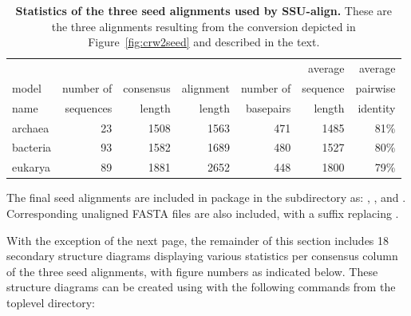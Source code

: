 \begin{table}
\begin{center}
\begin{tabular}{lrrrrrr} \hline
        &           &           &           &           & average   & average  \\
model   & number of & consensus & alignment & number of & sequence  & pairwise \\
name    & sequences & length    & length    & basepairs & length    & identity \\ \hline
archaea & 23        & 1508      & 1563      & 471       & 1485      & 81\%     \\
bacteria& 93        & 1582      & 1689      & 480       & 1527      & 80\%     \\
eukarya  & 89       & 1881      & 2652      & 448       & 1800      & 79\%     \\ 
\end{tabular}
\caption[Statistics of the three seed alignments used by SSU-align.]
{\textbf{Statistics of the three seed alignments used by
    SSU-align.} These are the three alignments resulting from the
     conversion depicted in Figure~\ref{fig:crw2seed} and
    described in the text.}
\label{tbl:finalseeds}
\end{center}
\end{table}

The final seed alignments are included in  package in
the  subdirectory as: ,
, and . Corresponding
unaligned FASTA files are also included, with a  suffix
replacing . 

With the exception of the next page, the remainder of this section
includes 18 secondary structure diagrams displaying various statistics
per consensus column of the three seed alignments, with figure numbers
as indicated below. These structure diagrams can be created using
 with the following commands from the toplevel
 directory:



